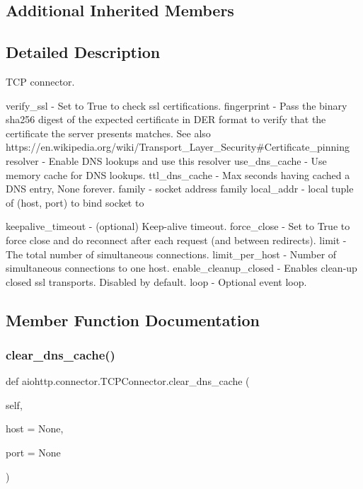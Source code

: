 \subsection*{Additional Inherited Members}


\subsection{Detailed Description}
\begin{DoxyVerb}TCP connector.

verify_ssl - Set to True to check ssl certifications.
fingerprint - Pass the binary sha256
    digest of the expected certificate in DER format to verify
    that the certificate the server presents matches. See also
    https://en.wikipedia.org/wiki/Transport_Layer_Security#Certificate_pinning
resolver - Enable DNS lookups and use this
    resolver
use_dns_cache - Use memory cache for DNS lookups.
ttl_dns_cache - Max seconds having cached a DNS entry, None forever.
family - socket address family
local_addr - local tuple of (host, port) to bind socket to

keepalive_timeout - (optional) Keep-alive timeout.
force_close - Set to True to force close and do reconnect
    after each request (and between redirects).
limit - The total number of simultaneous connections.
limit_per_host - Number of simultaneous connections to one host.
enable_cleanup_closed - Enables clean-up closed ssl transports.
                        Disabled by default.
loop - Optional event loop.
\end{DoxyVerb}
 

\subsection{Member Function Documentation}
\mbox{\label{classaiohttp_1_1connector_1_1_t_c_p_connector_a2c456259aee8271a66271e092919f179}} 
\subsubsection{\texorpdfstring{clear\+\_\+dns\+\_\+cache()}{clear\_dns\_cache()}}
{\footnotesize\ttfamily def aiohttp.\+connector.\+T\+C\+P\+Connector.\+clear\+\_\+dns\+\_\+cache (\begin{DoxyParamCaption}\item[{}]{self,  }\item[{}]{host = {\ttfamily None},  }\item[{}]{port = {\ttfamily None} }\end{DoxyParamCaption})}


